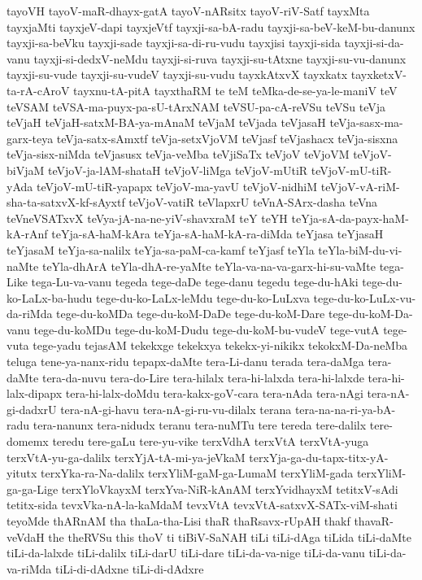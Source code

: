 {tayoVH
tayoV-maR-dhayx-gatA
tayoV-nARsitx
tayoV-riV-Satf
tayxMta
tayxjaMti
tayxjeV-dapi
tayxjeVtf
tayxji-sa-bA-radu
tayxji-sa-beV-keM-bu-danunx
tayxji-sa-beVku
tayxji-sade
tayxji-sa-di-ru-vudu
tayxjisi
tayxji-sida
tayxji-si-da-vanu
tayxji-si-dedxV-neMdu
tayxji-si-ruva
tayxji-su-tAtxne
tayxji-su-vu-danunx
tayxji-su-vude
tayxji-su-vudeV
tayxji-su-vudu
tayxkAtxvX
tayxkatx
tayxketxV-ta-rA-cAroV
tayxnu-tA-pitA
tayxthaRM
te
teM
teMka-de-se-ya-le-maniV
teV
teVSAM
teVSA-ma-puyx-pa-sU-tArxNAM
teVSU-pa-cA-reVSu
teVSu
teVja
teVjaH
teVjaH-satxM-BA-ya-mAnaM
teVjaM
teVjada
teVjasaH
teVja-sasx-ma-garx-teya
teVja-satx-sAmxtf
teVja-setxVjoVM
teVjasf
teVjashacx
teVja-sisxna
teVja-sisx-niMda
teVjasusx
teVja-veMba
teVjiSaTx
teVjoV
teVjoVM
teVjoV-biVjaM
teVjoV-ja-lAM-shataH
teVjoV-liMga
teVjoV-mUtiR
teVjoV-mU-tiR-yAda
teVjoV-mU-tiR-yapapx
teVjoV-ma-yavU
teVjoV-nidhiM
teVjoV-vA-riM-sha-ta-satxvX-kf-sAyxtf
teVjoV-vatiR
teVlapxrU
teVnA-SArx-dasha
teVna
teVneVSATxvX
teVya-jA-na-ne-yiV-shavxraM
teY
teYH
teYja-sA-da-payx-haM-kA-rAnf
teYja-sA-haM-kAra
teYja-sA-haM-kA-ra-diMda
teYjasa
teYjasaH
teYjasaM
teYja-sa-nalilx
teYja-sa-paM-ca-kamf
teYjasf
teYla
teYla-biM-du-vi-naMte
teYla-dhArA
teYla-dhA-re-yaMte
teYla-va-na-va-garx-hi-su-vaMte
tega-Like
tega-Lu-va-vanu
tegeda
tege-daDe
tege-danu
tegedu
tege-du-hAki
tege-du-ko-LaLx-ba-hudu
tege-du-ko-LaLx-leMdu
tege-du-ko-LuLxva
tege-du-ko-LuLx-vu-da-riMda
tege-du-koMDa
tege-du-koM-DaDe
tege-du-koM-Dare
tege-du-koM-Da-vanu
tege-du-koMDu
tege-du-koM-Dudu
tege-du-koM-bu-vudeV
tege-vutA
tege-vuta
tege-yadu
tejasAM
tekekxge
tekekxya
tekekx-yi-nikikx
tekokxM-Da-neMba
teluga
tene-ya-nanx-ridu
tepapx-daMte
tera-Li-danu
terada
tera-daMga
tera-daMte
tera-da-nuvu
tera-do-Lire
tera-hilalx
tera-hi-lalxda
tera-hi-lalxde
tera-hi-lalx-dipapx
tera-hi-lalx-doMdu
tera-kakx-goV-cara
tera-nAda
tera-nAgi
tera-nA-gi-dadxrU
tera-nA-gi-havu
tera-nA-gi-ru-vu-dilalx
terana
tera-na-na-ri-ya-bA-radu
tera-nanunx
tera-nidudx
teranu
tera-nuMTu
tere
tereda
tere-dalilx
tere-domemx
teredu
tere-gaLu
tere-yu-vike
terxVdhA
terxVtA
terxVtA-yuga
terxVtA-yu-ga-dalilx
terxYjA-tA-mi-ya-jeVkaM
terxYja-ga-du-tapx-titx-yA-yitutx
terxYka-ra-Na-dalilx
terxYliM-gaM-ga-LumaM
terxYliM-gada
terxYliM-ga-ga-Lige
terxYloVkayxM
terxYva-NiR-kAnAM
terxYvidhayxM
tetitxV-sAdi
tetitx-sida
tevxVka-nA-la-kaMdaM
tevxVtA
tevxVtA-satxvX-SATx-viM-shati
teyoMde
thARnAM
tha
thaLa-tha-Lisi
thaR
thaRsavx-rUpAH
thakf
thavaR-veVdaH
the
theRVSu
this
thoV
ti
tiBiV-SaNAH
tiLi
tiLi-dAga
tiLida
tiLi-daMte
tiLi-da-lalxde
tiLi-dalilx
tiLi-darU
tiLi-dare
tiLi-da-va-nige
tiLi-da-vanu
tiLi-da-va-riMda
tiLi-di-dAdxne
tiLi-di-dAdxre
}
